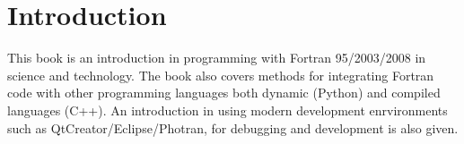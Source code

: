 \chapter{Introduction}

This book is an introduction in programming with Fortran
95/2003/2008 in science and technology. The book also covers
methods for integrating Fortran code with other programming
languages both dynamic (Python) and compiled languages (C++).
An introduction in using modern development enrvironments such
as QtCreator/Eclipse/Photran, for debugging and development is also
given.
